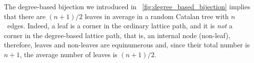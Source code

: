 The degree\hyp{}based bijection we introduced in
\fig~\vref{fig:degree_based_bijection} implies that there are
\((n+1)/2\) leaves in average in a random Catalan tree with
\(n\)~edges. Indeed, a leaf is a corner in the ordinary lattice path,
and it is \emph{not} a corner in the degree\hyp{}based lattice path,
that is, an internal node (non\hyp{}leaf), therefore, leaves and
non\hyp{}leaves are equinumerous and, since their total number is
\(n+1\), the average number of leaves is \((n+1)/2\).


